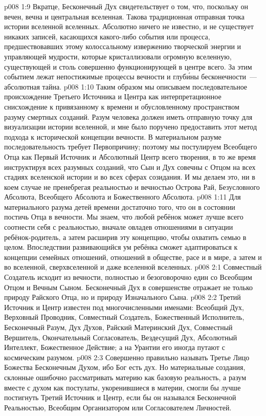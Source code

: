 \vs p008 1:9 Вкратце, Бесконечный Дух свидетельствует о том, что, поскольку он вечен, вечна и центральная вселенная. Такова традиционная отправная точка истории вселенной вселенных. Абсолютно ничего не известно, и не существует никаких записей, касающихся какого\hyp{}либо события или процесса, предшествовавших этому колоссальному извержению творческой энергии и управляющей мудрости, которые кристаллизовали огромную вселенную, существующей и столь совершенно функционирующей в центре всего. За этим событием лежат непостижимые процессы вечности и глуб\'ины бесконечности~--- абсолютная тайна.
\vs p008 1:10 \pc Таким образом мы описываем последовательное происхождение Третьего Источника и Центра как интерпретационное снисхождение к привязанному к времени и обусловленному пространством разуму смертных созданий. Разум человека должен иметь отправную точку для визуализации истории вселенной, и мне было поручено предоставить этот метод подхода к исторической концепции вечности. В материальном разуме последовательность требует Первопричину; поэтому мы постулируем Всеобщего Отца как Первый Источник и Абсолютный Центр всего творения, в то же время инструктируя всех разумных созданий, что Сын и Дух совечны с Отцом на всех стадиях вселенской истории и во всех сферах созидания. И мы делаем это, ни в коем случае не пренебрегая реальностью и вечностью Острова Рай, Безусловного Абсолюта, Всеобщего Абсолюта и Божественного Абсолюта.
\vs p008 1:11 Для материального разума детей времени достаточно того, что он в состоянии постичь Отца в вечности. Мы знаем, что любой ребёнок может лучше всего соотнести себя с реальностью, вначале овладев отношениями в ситуации ребёнок\hyp{}родитель, а затем расширив эту концепцию, чтобы охватить семью в целом. Впоследствии развивающийся ум ребёнка сможет адаптироваться к концепции семейных отношений, отношений в обществе, расе и в мире, а затем и во вселенной, сверхвселенной и даже вселенной вселенных.
\vs p008 2:1 Совместный Создатель исходит из вечности, полностью и безоговорочно един со Всеобщим Отцом и Вечным Сыном. Бесконечный Дух в совершенстве отражает не только природу Райского Отца, но и природу Изначального Сына.
\vs p008 2:2 \pc Третий Источник и Центр известен под многочисленными именами: Всеобщий Дух, Верховный Проводник, Совместный Создатель, Божественный Исполнитель, Бесконечный Разум, Дух Духов, Райский Материнский Дух, Совместный Вершитель, Окончательный Согласователь, Вездесущий Дух, Абсолютный Интеллект, Божественное Действие; а на Урантии его иногда путают с космическим разумом.
\vs p008 2:3 Совершенно правильно называть Третье Лицо Божества Бесконечным Духом, ибо Бог есть дух. Но материальные создания, склонные ошибочно рассматривать материю как базовую реальность, а разум вместе с духом как постулаты, укоренившиеся в материи, смогли бы лучше постигнуть Третий Источник и Центр, если бы он назывался Бесконечной Реальностью, Всеобщим Организатором или Согласователем Личностей.
